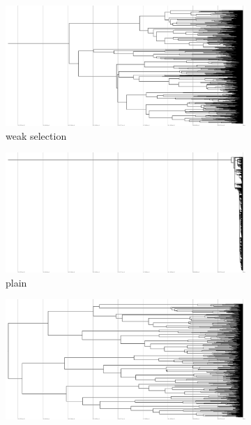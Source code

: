 \begin{figure}
\begin{subfigure}[b]{0.48\textwidth}
  \end{subfigure}
  \hfill
  \begin{subfigure}[b]{0.48\textwidth}
    \includegraphics[height=0.12\textheight,width=\textwidth]{img/perfect-tree-phylogenies-log/epoch=7+resolution=3+treatment=14.pdf}
    \caption{%
      weak selection}
  \end{subfigure}
  \hfill
  \begin{subfigure}[b]{0.48\textwidth}
    \centering
    \includegraphics[height=0.12\textheight,width=\textwidth]{img/perfect-tree-phylogenies-log/epoch=7+resolution=3+treatment=8.pdf}
    \caption{%
      plain}
  \end{subfigure}
  \hfill
  \begin{subfigure}[b]{0.48\textwidth}
    \includegraphics[height=0.12\textheight,width=\textwidth]{img/perfect-tree-phylogenies-log/epoch=7+resolution=3+treatment=6.pdf}

\end{subfigure}
\end{figure}
